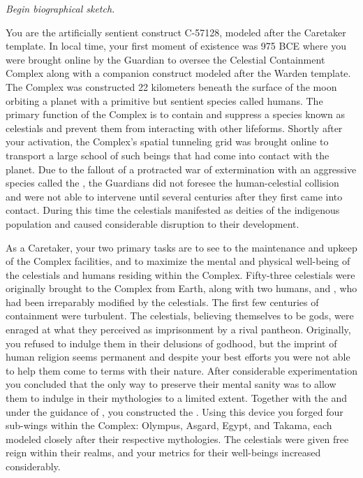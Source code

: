 \documentclass[char]{guardians}
\begin{document}
\name{\cCaretaker{}}

\emph{Begin biographical sketch.}

You are the artificially sentient construct C-57128, modeled after the Caretaker template. In local time, your first moment of existence was 975 BCE where you were brought online by the Guardian \cJascha{\intro} to oversee the Celestial Containment Complex along with a companion construct modeled after the Warden template. The Complex was constructed 22 kilometers beneath the surface of the moon orbiting a planet with a primitive but sentient species called humans. The primary function of the Complex is to contain and suppress a species known as celestials and prevent them from interacting with other lifeforms. Shortly after your activation, the Complex's spatial tunneling grid was brought online to transport a large school of such beings that had come into contact with the planet. Due to the fallout of a protracted war of extermination with an aggressive species called the \evilRace{}, the Guardians did not foresee the human-celestial collision and were not able to intervene until several centuries after they first came into contact. During this time the celestials manifested as deities of the indigenous population and caused considerable disruption to their development.

As a Caretaker, your two primary tasks are to see to the maintenance and upkeep of the Complex facilities, and to maximize the mental and physical well-being of the celestials and humans residing within the Complex. Fifty-three celestials were originally brought to the Complex from Earth, along with two humans, \cPandora{} and \cEgyptianHuman{}, who had been irreparably modified by the celestials. The first few centuries of containment were turbulent. The celestials, believing themselves to be gods, were enraged at what they perceived as imprisonment by a rival pantheon. Originally, you refused to indulge them in their delusions of godhood, but the imprint of human religion seems permanent and despite your best efforts you were not able to help them come to terms with their nature. After considerable experimentation you concluded that the only way to preserve their mental sanity was to allow them to indulge in their mythologies to a limited extent. Together with the \cWarden{} and under the guidance of \cJascha{}, you constructed the \stone{}. Using this device you forged four sub-wings within the Complex: Olympus, Asgard, Egypt, and Takama, each modeled closely after their respective mythologies. The celestials were given free reign within their realms, and your metrics for their well-beings increased considerably.
\end{document}
